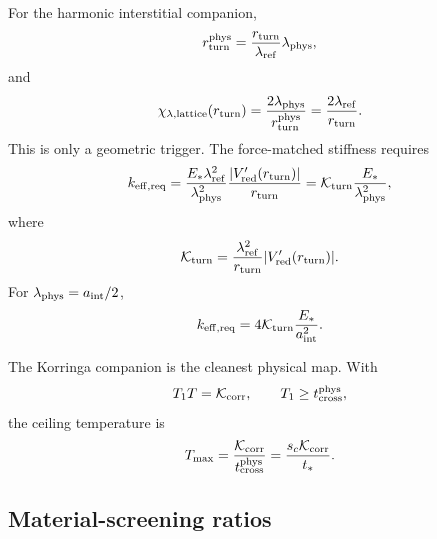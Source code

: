 For the harmonic interstitial companion,
\begin{equation}
\label{eq:app-part08-stage253-physical-radius}
r_{\rm turn}^{\rm phys}=\frac{r_{\rm turn}}{\lambda_{\rm ref}}\lambda_{\rm phys},
\end{equation}
and
\begin{equation}
\label{eq:app-part08-stage253-chi-lattice}
\chi_{\lambda,{\rm lattice}}(r_{\rm turn})
=
\frac{2\lambda_{\rm phys}}{r_{\rm turn}^{\rm phys}}
=
\frac{2\lambda_{\rm ref}}{r_{\rm turn}}.
\end{equation}
This is only a geometric trigger.  The force-matched stiffness requires
\begin{equation}
\label{eq:app-part08-stage253-force-match}
k_{\rm eff,req}
=
\frac{E_*\lambda_{\rm ref}^{2}}{\lambda_{\rm phys}^{2}}
\frac{|V_{\rm red}'(r_{\rm turn})|}{r_{\rm turn}}
=
\mathcal K_{\rm turn}\frac{E_*}{\lambda_{\rm phys}^{2}},
\end{equation}
where
\begin{equation}
\label{eq:app-part08-stage253-kturn}
\mathcal K_{\rm turn}=\frac{\lambda_{\rm ref}^{2}}{r_{\rm turn}}|V_{\rm red}'(r_{\rm turn})|.
\end{equation}
For \(\lambda_{\rm phys}=a_{\rm int}/2\),
\begin{equation}
\label{eq:app-part08-stage253-k-aint}
k_{\rm eff,req}=4\mathcal K_{\rm turn}\frac{E_*}{a_{\rm int}^{2}}.
\end{equation}

The Korringa companion is the cleanest physical map.  With
\begin{equation}
\label{eq:app-part08-stage253-korringa}
T_1T=\mathcal K_{\rm corr},
\qquad
T_1\ge t_{\rm cross}^{\rm phys},
\end{equation}
the ceiling temperature is
\begin{equation}
\label{eq:app-part08-stage253-tmax}
T_{\max}=\frac{\mathcal K_{\rm corr}}{t_{\rm cross}^{\rm phys}}
=\frac{s_c\mathcal K_{\rm corr}}{t_*}.
\end{equation}

\subsection{Material-screening ratios}
\label{subsec:app-part08-stage253-screening-ratios}

